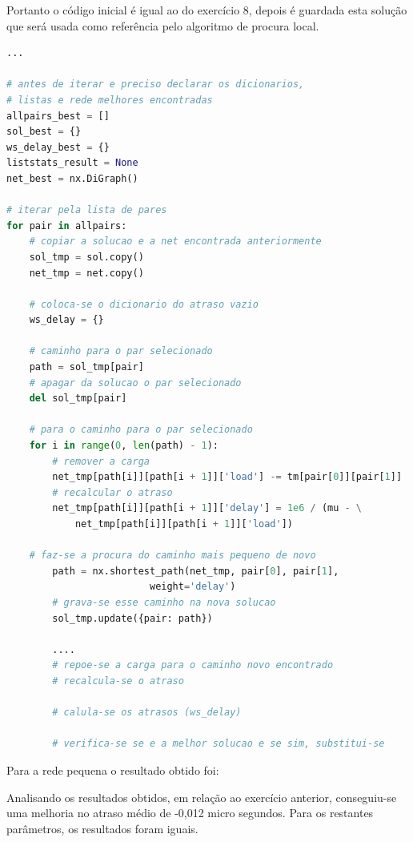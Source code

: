 \documentclass[pdftex,12pt,a4paper]{report}
\begin{document}
Portanto o código inicial é igual ao do exercício 8, depois é guardada esta solução que será usada como referência pelo algoritmo de procura local. 

\begin{lstlisting}[language=python]
...

# antes de iterar e preciso declarar os dicionarios, 
# listas e rede melhores encontradas
allpairs_best = []
sol_best = {}
ws_delay_best = {}
liststats_result = None
net_best = nx.DiGraph()

# iterar pela lista de pares
for pair in allpairs:
	# copiar a solucao e a net encontrada anteriormente
	sol_tmp = sol.copy()
    net_tmp = net.copy()
    
    # coloca-se o dicionario do atraso vazio
    ws_delay = {}
	
	# caminho para o par selecionado
    path = sol_tmp[pair]
    # apagar da solucao o par selecionado
    del sol_tmp[pair]
    
    # para o caminho para o par selecionado
    for i in range(0, len(path) - 1):
    	# remover a carga
        net_tmp[path[i]][path[i + 1]]['load'] -= tm[pair[0]][pair[1]]
        # recalcular o atraso
        net_tmp[path[i]][path[i + 1]]['delay'] = 1e6 / (mu - \
        	net_tmp[path[i]][path[i + 1]]['load'])
		
	# faz-se a procura do caminho mais pequeno de novo
    	path = nx.shortest_path(net_tmp, pair[0], pair[1],
    					 weight='delay')
    	# grava-se esse caminho na nova solucao
    	sol_tmp.update({pair: path})		
    	
    	....
    	# repoe-se a carga para o caminho novo encontrado
    	# recalcula-se o atraso
    	
    	# calula-se os atrasos (ws_delay)
    	
    	# verifica-se se e a melhor solucao e se sim, substitui-se
\end{lstlisting}

Para a rede pequena o resultado obtido foi:







Analisando os resultados obtidos, em relação ao exercício anterior, conseguiu-se uma melhoria no atraso médio de -0,012 micro segundos. Para os restantes parâmetros, os resultados foram iguais.

\end{document}
